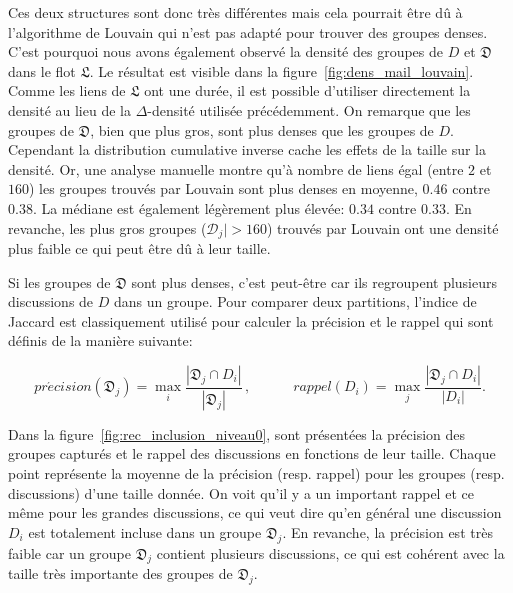 Ces deux structures sont donc très différentes mais cela pourrait être dû à l'algorithme de Louvain qui n'est pas adapté pour trouver des groupes denses.
C'est pourquoi nous avons également observé la densité des groupes de $D$ et $\mathfrak{D}$ dans le flot $\mathfrak{L}$.
Le résultat est visible dans la figure~\ref{fig:dens_mail_louvain}.
Comme les liens de $\mathfrak{L}$ ont une durée, il est possible d'utiliser directement la densité au lieu de la $\Delta$-densité utilisée précédemment.
On remarque que les groupes de $\mathfrak{D}$, bien que plus gros, sont plus denses que les groupes de $D$.
Cependant la distribution cumulative inverse cache les effets de la taille sur la densité.
Or, une analyse manuelle montre qu'à nombre de liens égal (entre $2$ et $160$) les groupes trouvés par Louvain sont plus denses en moyenne, $0.46$ contre $0.38$. 
La médiane est également légèrement plus élevée: $0.34$ contre $0.33$.
En revanche, les plus gros groupes ($\mathcal{D}_j|>160$) trouvés par Louvain ont une densité plus faible ce qui peut être dû à leur taille.

Si les groupes de $\mathfrak{D}$ sont plus denses, c'est peut-être car ils regroupent plusieurs discussions de $D$ dans un groupe.
Pour comparer deux partitions, l'indice de Jaccard est classiquement utilisé pour calculer la précision et le rappel qui sont définis de la manière suivante:

\begin{equation*}
pr\acute{e}cision(\mathfrak{D}_j)= \max_{i} \frac{|\mathfrak{D}_j \cap D_i|}{|\mathfrak{D}_j|}\,, \quad \qquad
rappel(D_i)= \max_{j} \frac{|\mathfrak{D}_j \cap D_i|}{|D_i|}.
\label{eq:rappel}
\end{equation*}

Dans la figure~\ref{fig:rec_inclusion_niveau0}, sont présentées la précision des groupes capturés et le rappel des discussions en fonctions de leur taille.
Chaque point représente la moyenne de la précision (resp. rappel) pour les groupes (resp. discussions) d'une taille donnée.
On voit qu'il y a un important rappel et ce même pour les grandes discussions, ce qui veut dire qu'en général une discussion $D_i$ est totalement incluse dans un groupe $\mathfrak{D}_j$.
En revanche, la précision est très faible car un groupe $\mathfrak{D}_j$ contient plusieurs discussions, ce qui est cohérent avec la taille très importante des groupes de $\mathfrak{D}_j$.


